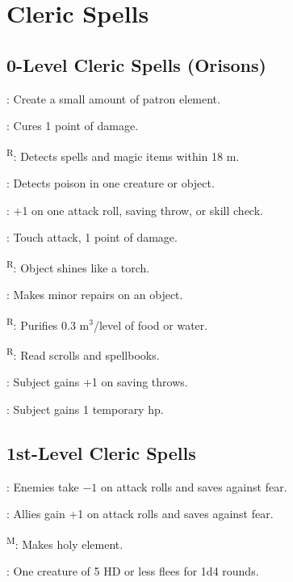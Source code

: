 \section{Cleric Spells}



\subsection{0-Level Cleric Spells (Orisons)}

: Create a small amount of patron element.

: Cures 1 point of damage.

\textsuperscript{R}: Detects spells and magic items within 18 m.

: Detects poison in one creature or object.

: +1 on one attack roll, saving throw, or skill check.

: Touch attack, 1 point of damage.

\textsuperscript{R}: Object shines like a torch.

: Makes minor repairs on an object.

\textsuperscript{R}: Purifies 0.3 m$^3$/level of food or water.

\textsuperscript{R}: Read scrolls and spellbooks.

: Subject gains +1 on saving throws.

: Subject gains 1 temporary hp.



\subsection{1st-Level Cleric Spells}

: Enemies take $-1$ on attack rolls and saves against fear.

: Allies gain +1 on attack rolls and saves against fear.

\textsuperscript{M}: Makes holy element. %

: One creature of 5 HD or less flees for 1d4 rounds.

